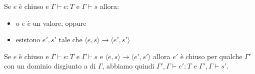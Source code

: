 \begin{tcolorbox}[title = Progress (\textit{riformulata})]
    Se $e$ è chiuso e $\Gamma \vdash e : T$ e $\Gamma \vdash s$ allora:
    \begin{itemize}
        \item o $e$ è un valore, oppure
        \item esistono $e', s'$ tale che $\langle e, s \rangle \rightarrow \langle e', s' \rangle$
    \end{itemize}
\end{tcolorbox}

\begin{tcolorbox}[title = Preservazione dei tipi]
    Se $e$ è chiuso e $\Gamma \vdash e : T$ e $\Gamma \vdash s$ e
    $\langle e, s \rangle \rightarrow \langle e', s' \rangle$ allora 
    $e'$ è chiuso per qualche $\Gamma'$ con un dominio disgiunto a di $\Gamma$, abbiamo quindi 
    $\Gamma', \Gamma \vdash e' : T$ e $\Gamma', \Gamma \vdash s'$. 
\end{tcolorbox}